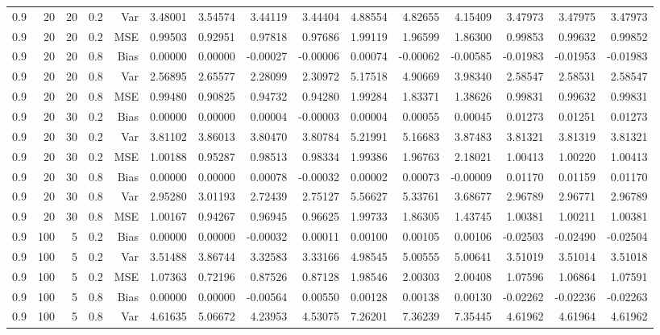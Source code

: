 \begin{table}[!htbp]
\begin{tabular}{lrrrrrrrrrrrrrr}
0.9 &  20 & 20 & 0.2 & Var & 3.48001 & 3.54574 & 3.44119 & 3.44404 & 4.88554 & 4.82655 & 4.15409 & 3.47973 & 3.47975 & 3.47973 \\
0.9 &  20 & 20 & 0.2 & MSE & 0.99503 & 0.92951 & 0.97818 & 0.97686 & 1.99119 & 1.96599 & 1.86300 & 0.99853 & 0.99632 & 0.99852 \\
0.9 &  20 & 20 & 0.8 & Bias & 0.00000 & 0.00000 & -0.00027 & -0.00006 & 0.00074 & -0.00062 & -0.00585 & -0.01983 & -0.01953 & -0.01983 \\
0.9 &  20 & 20 & 0.8 & Var & 2.56895 & 2.65577 & 2.28099 & 2.30972 & 5.17518 & 4.90669 & 3.98340 & 2.58547 & 2.58531 & 2.58547 \\
0.9 &  20 & 20 & 0.8 & MSE & 0.99480 & 0.90825 & 0.94732 & 0.94280 & 1.99284 & 1.83371 & 1.38626 & 0.99831 & 0.99632 & 0.99831 \\
0.9 &  20 & 30 & 0.2 & Bias & 0.00000 & 0.00000 & 0.00004 & -0.00003 & 0.00004 & 0.00055 & 0.00045 & 0.01273 & 0.01251 & 0.01273 \\
0.9 &  20 & 30 & 0.2 & Var & 3.81102 & 3.86013 & 3.80470 & 3.80784 & 5.21991 & 5.16683 & 3.87483 & 3.81321 & 3.81319 & 3.81321 \\
0.9 &  20 & 30 & 0.2 & MSE & 1.00188 & 0.95287 & 0.98513 & 0.98334 & 1.99386 & 1.96763 & 2.18021 & 1.00413 & 1.00220 & 1.00413 \\
0.9 &  20 & 30 & 0.8 & Bias & 0.00000 & 0.00000 & 0.00078 & -0.00032 & 0.00002 & 0.00073 & -0.00009 & 0.01170 & 0.01159 & 0.01170 \\
0.9 &  20 & 30 & 0.8 & Var & 2.95280 & 3.01193 & 2.72439 & 2.75127 & 5.56627 & 5.33761 & 3.68677 & 2.96789 & 2.96771 & 2.96789 \\
0.9 &  20 & 30 & 0.8 & MSE & 1.00167 & 0.94267 & 0.96945 & 0.96625 & 1.99733 & 1.86305 & 1.43745 & 1.00381 & 1.00211 & 1.00381 \\
0.9 & 100 &  5 & 0.2 & Bias & 0.00000 & 0.00000 & -0.00032 & 0.00011 & 0.00100 & 0.00105 & 0.00106 & -0.02503 & -0.02490 & -0.02504 \\
0.9 & 100 &  5 & 0.2 & Var & 3.51488 & 3.86744 & 3.32583 & 3.33166 & 4.98545 & 5.00555 & 5.00641 & 3.51019 & 3.51014 & 3.51018 \\
0.9 & 100 &  5 & 0.2 & MSE & 1.07363 & 0.72196 & 0.87526 & 0.87128 & 1.98546 & 2.00303 & 2.00408 & 1.07596 & 1.06864 & 1.07591 \\
0.9 & 100 &  5 & 0.8 & Bias & 0.00000 & 0.00000 & -0.00564 & 0.00550 & 0.00128 & 0.00138 & 0.00130 & -0.02262 & -0.02236 & -0.02263 \\
0.9 & 100 &  5 & 0.8 & Var & 4.61635 & 5.06672 & 4.23953 & 4.53075 & 7.26201 & 7.36239 & 7.35445 & 4.61962 & 4.61964 & 4.61962 \\

\end{tabular}
\end{table}
